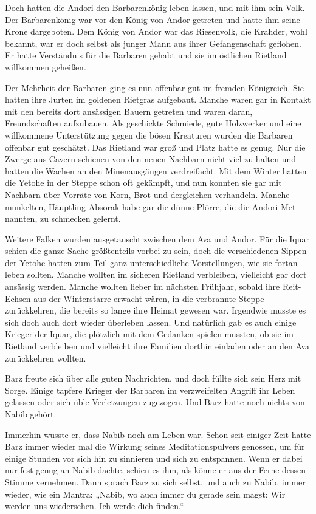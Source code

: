 Doch hatten die Andori den Barbarenkönig leben lassen, und mit ihm sein Volk. Der Barbarenkönig war vor den König von Andor getreten und hatte ihm seine Krone dargeboten. Dem König von Andor war das Riesenvolk, die Krahder, wohl bekannt, war er doch selbst als junger Mann aus ihrer Gefangenschaft geflohen. Er hatte Verständnis für die Barbaren gehabt und sie im östlichen Rietland willkommen geheißen.

Der Mehrheit der Barbaren ging es nun offenbar gut im fremden Königreich. Sie hatten ihre Jurten im goldenen Rietgras aufgebaut. Manche waren gar in Kontakt mit den bereits dort ansässigen Bauern getreten und waren daran, Freundschaften aufzubauen. Als geschickte Schmiede, gute Holzwerker und eine willkommene Unterstützung gegen die bösen Kreaturen wurden die Barbaren offenbar gut geschätzt. Das Rietland war groß und Platz hatte es genug. Nur die Zwerge aus Cavern schienen von den neuen Nachbarn nicht viel zu halten und hatten die Wachen an den Minenausgängen verdreifacht. Mit dem Winter hatten die Yetohe in der Steppe schon oft gekämpft, und nun konnten sie gar mit Nachbarn über Vorräte von Korn, Brot und dergleichen verhandeln. Manche munkelten, Häuptling Absorak habe gar die dünne Plörre, die die Andori Met nannten, zu schmecken gelernt.

Weitere Falken wurden ausgetauscht zwischen dem Ava und Andor. Für die Iquar schien die ganze Sache größtenteils vorbei zu sein, doch die verschiedenen Sippen der Yetohe hatten zum Teil ganz unterschiedliche Vorstellungen, wie sie fortan leben sollten. Manche wollten im sicheren Rietland verbleiben, vielleicht gar dort ansässig werden. Manche wollten lieber im nächsten Frühjahr, sobald ihre Reit-Echsen aus der Winterstarre erwacht wären, in die verbrannte Steppe zurückkehren, die bereits so lange ihre Heimat gewesen war. Irgendwie musste es sich doch auch dort wieder überleben lassen. Und natürlich gab es auch einige Krieger der Iquar, die plötzlich mit dem Gedanken spielen mussten, ob sie im Rietland verbleiben und vielleicht ihre Familien dorthin einladen oder an den Ava zurückkehren wollten.

Barz freute sich über alle guten Nachrichten, und doch füllte sich sein Herz mit Sorge. Einige tapfere Krieger der Barbaren im verzweifelten Angriff ihr Leben gelassen oder sich üble Verletzungen zugezogen. Und Barz hatte noch nichts von Nabib gehört.

Immerhin wusste er, dass Nabib noch am Leben war. Schon seit einiger Zeit hatte Barz immer wieder mal die Wirkung seines Meditationspulvers genossen, um für einige Stunden vor sich hin zu sinnieren und sich zu entspannen. Wenn er dabei nur fest genug an Nabib dachte, schien es ihm, als könne er aus der Ferne dessen Stimme vernehmen. Dann sprach Barz zu sich selbst, und auch zu Nabib, immer wieder, wie ein Mantra: „Nabib, wo auch immer du gerade sein magst: Wir werden uns wiedersehen. Ich werde dich finden.“

